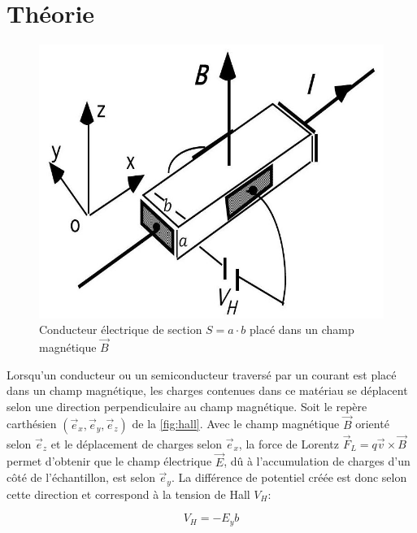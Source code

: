 \section{Théorie}

\begin{minipage}{\textwidth}
    \begin{figure}
        \centering
        \includegraphics[width=\linewidth]{figures/hall.png}
        \caption{Conducteur électrique de section \(S = a \cdot b\) placé dans un champ magnétique \(\vec{B}\) \cite{notice}}
        \label{fig:hall}
        \vspace*{1cm}
    \end{figure}

    Lorsqu'un conducteur ou un semiconducteur traversé par un courant est placé dans un champ magnétique, les charges contenues dans ce matériau se déplacent selon une direction perpendiculaire au champ magnétique. Soit le repère carthésien \((\vec{e}_x,\vec{e}_y,\vec{e}_z)\) de la \autoref{fig:hall}. Avec le champ magnétique \(\vec{B}\) orienté selon \(\vec{e}_z\) et le déplacement de charges selon \(\vec{e}_x\), la force de Lorentz \(\vec{F}_L = q\vec{v} \times \vec{B}\) permet d'obtenir que le champ électrique \(\vec{E}\), dû à l'accumulation de charges d'un côté de l'échantillon, est selon \(\vec{e}_y\). La différence de potentiel créée est donc selon cette direction et correspond à la tension de Hall \(V_H\):

    \begin{equation}
        V_H = -E_yb
    \end{equation}


\end{minipage}
